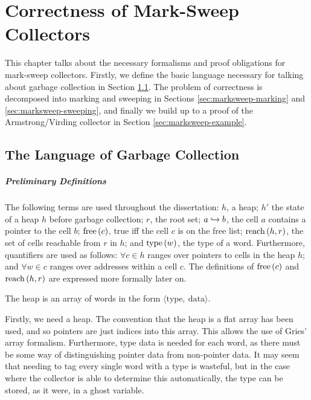 \chapter{Correctness of Mark-Sweep Collectors}
\label{sec:marksweep}

This chapter talks about the necessary formalisms and proof
obligations for mark-sweep collectors. Firstly, we define the basic
language necessary for talking about garbage collection in Section
\ref{sec:marksweep-defns}. The problem of correctness is decomposed
into marking and sweeping in Sections \ref{sec:marksweep-marking} and
\ref{sec:marksweep-sweeping}, and finally we build up to a proof of
the Armstrong/Virding\cite{Armstrong95} collector in Section
\ref{sec:marksweep-example}.

\section{The Language of Garbage Collection}
\label{sec:marksweep-defns}

\paragraph{Preliminary Definitions}
The following terms are used throughout the dissertation: $h$, a heap;
$h'$ the state of a heap $h$ before garbage collection; $r$, the root
set; $a \hookrightarrow b$, the cell $a$ contains a pointer to the cell $b$;
$\mathrm{free}\left(c\right)$, true iff the cell $c$ is on the free list; $\mathrm{reach}\left(h, r\right)$,
the set of cells reachable from $r$ in $h$; and $\mathrm{type}\left(w\right)$, the type
of a word. Furthermore, quantifiers are used as follows: $\forall c
\in h$ ranges over pointers to cells in the heap $h$; and $\forall w
\in c$ ranges over addresses within a cell $c$. The definitions of
$\mathrm{free}\left(c\right)$ and $\mathrm{reach}\left(h, r\right)$ are expressed more formally later on.

\begin{definition}[Heap]
  \label{def:ms-heap}
  The heap is an array of words in the form $\langle \mathrm{type},\
  \mathrm{data}\rangle$.
\end{definition}

Firstly, we need a heap. The convention that the heap is a flat array
has been used, and so pointers are just indices into this array. This
allows the use of Gries' array formalism\cite{Gries87}. Furthermore,
type data is needed for each word, as there must be some way of
distinguishing pointer data from non-pointer data. It may seem that
needing to tag every single word with a type is wasteful, but in the
case where the collector is able to determine this automatically, the
type can be stored, as it were, in a ghost variable.


